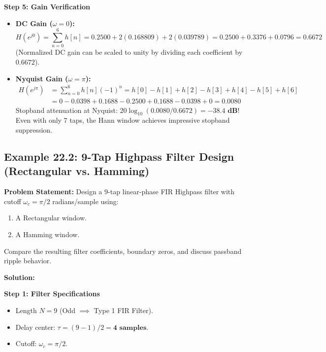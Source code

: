 \documentclass[11pt,a4paper]{article}
\begin{document}
\vspace{1mm}
\noindent\textbf{Step 5: Gain Verification}
\begin{itemize}
    \item \textbf{DC Gain ($\omega = 0$):}
    \begin{equation}
    H(e^{j0}) = \sum_{n=0}^6 h[n] = 0.2500 + 2(0.168809) + 2(0.039789) = 0.2500 + 0.3376 + 0.0796 = \mathbf{0.6672}
    \end{equation}
    (Normalized DC gain can be scaled to unity by dividing each coefficient by $0.6672$).
    \item \textbf{Nyquist Gain ($\omega = \pi$):}
    \begin{align}
    H(e^{j\pi}) &= \sum_{n=0}^6 h[n](-1)^n = h[0] - h[1] + h[2] - h[3] + h[4] - h[5] + h[6] \nonumber \\
    &= 0 - 0.0398 + 0.1688 - 0.2500 + 0.1688 - 0.0398 + 0 = \mathbf{0.0080}
    \end{align}
    Stopband attenuation at Nyquist: $20\log_{10}(0.0080 / 0.6672) = \mathbf{-38.4 \text{ dB}}$! Even with only 7 taps, the Hann window achieves impressive stopband suppression.
\end{itemize}

\subsection{Example 22.2: 9-Tap Highpass Filter Design (Rectangular vs. Hamming)}
\textbf{Problem Statement:} Design a 9-tap linear-phase FIR Highpass filter with cutoff $\omega_c = \pi/2$ radians/sample using:
\begin{enumerate}
    \item A Rectangular window.
    \item A Hamming window.
\end{enumerate}
Compare the resulting filter coefficients, boundary zeros, and discuss passband ripple behavior.

\vspace{1mm}
\noindent\textbf{Solution:}

\noindent\textbf{Step 1: Filter Specifications}
\begin{itemize}
    \item Length $N = 9$ (Odd $\implies$ Type 1 FIR Filter).
    \item Delay center: $\tau = (9-1)/2 = \mathbf{4 \text{ samples}}$.
    \item Cutoff: $\omega_c = \pi/2$.
\end{itemize}
\end{document}

